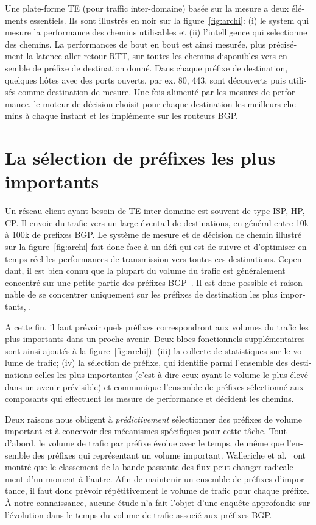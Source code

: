 \begin{otherlanguage}{french}
Une plate-forme TE (pour traffic inter-domaine) basée sur la mesure a deux éléments essentiels.
Ils sont illustrés en noir sur la figure~\ref{fig:archi}: (i) le system qui mesure la performance des chemins utilisables et 
(ii) l'intelligence qui selectionne des chemins.
La performances de bout en bout est ainsi mesurée, plus précisément la latence aller-retour \acf{RTT}, 
sur toutes les chemins disponibles vers en semble de préfixe de destination donné.
Dans chaque préfixe de destination, quelques hôtes avec des ports ouverts, par ex. 80, 443, sont découverts puis utilisés comme destination de mesure.
Une fois alimenté par les mesures de performance, le moteur de décision choisit pour chaque destination les meilleurs chemins à chaque instant et les implémente sur les routeurs BGP.

\section*{La sélection de préfixes les plus importants}

Un réseau client ayant besoin de \acf{TE} inter-domaine est souvent de type \acf{ISP}, \acf{HP}, \acf{CP}.
Il envoie du trafic vers un large éventail de destinations, en général entre 10k à 100k de prefixes BGP.
Le système de mesure et de décision de chemin illustré sur la figure~\ref{fig:archi} fait donc face à un défi 
qui est de suivre et d'optimiser en temps réel les performances de transmission vers toutes ces destinations.
Cependant, il est bien connu que la plupart du volume du trafic est généralement concentré sur une petite partie des préfixes BGP~\cite{Fang1999, Feamster2003, Papagiannaki2005, Sarrar2012}.
Il est donc possible et raisonnable de se concentrer uniquement sur les préfixes de destination les plus importants, .

A cette fin, il faut prévoir quels préfixes correspondront aux volumes du trafic les plus importants dans un proche avenir.
Deux blocs fonctionnels supplémentaires sont ainsi ajoutés à la figure~\ref{fig:archi}): 
(iii) la collecte de statistiques sur le volume de trafic; 
(iv) la sélection de préfixe, qui identifie parmi l'ensemble des destinations celles les plus importantes (c'est-à-dire ceux ayant le volume le plus élevé dans un avenir prévisible) 
et communique l'ensemble de préfixes sélectionné aux composants qui effectuent les mesure de performance et décident les chemins.

Deux raisons nous obligent à \textit{prédictivement} sélectionner des préfixes de volume important et 
à concevoir des mécanismes spécifiques pour cette tâche.
Tout d'abord, le volume de trafic par préfixe évolue avec le temps, 
de même que l'ensemble des préfixes qui représentant un volume important.
Walleriche et al.~\cite{Wallerich2006} ont montré que le classement de la bande passante des flux 
peut changer radicalement d'un moment à l'autre.
Afin de maintenir un ensemble de préfixes d'importance, 
il faut donc prévoir répétitivement le volume de trafic pour chaque préfixe.
À notre connaissance, aucune étude n'a fait l'objet d'une enquête approfondie 
sur l'évolution dans le temps du volume de trafic associé aux préfixes BGP.


\end{otherlanguage}
